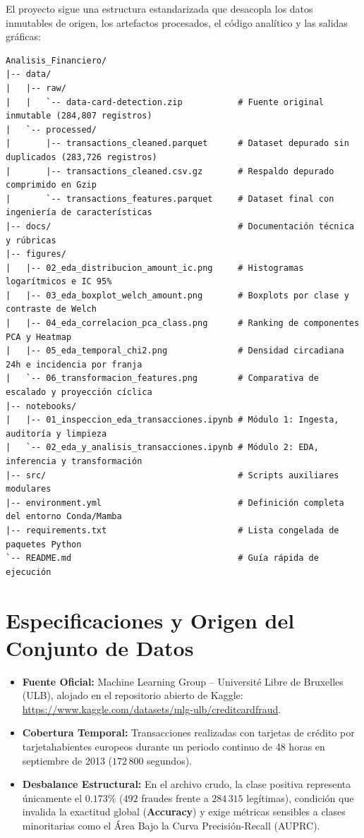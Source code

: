 \documentclass[11pt]{article}
\begin{document}
El proyecto sigue una estructura estandarizada que desacopla los datos inmutables de origen, los artefactos procesados, el código analítico y las salidas gráficas:

\begin{verbatim}
Analisis_Financiero/
|-- data/
|   |-- raw/
|   |   `-- data-card-detection.zip           # Fuente original inmutable (284,807 registros)
|   `-- processed/
|       |-- transactions_cleaned.parquet      # Dataset depurado sin duplicados (283,726 registros)
|       |-- transactions_cleaned.csv.gz       # Respaldo depurado comprimido en Gzip
|       `-- transactions_features.parquet     # Dataset final con ingeniería de características
|-- docs/                                     # Documentación técnica y rúbricas
|-- figures/
|   |-- 02_eda_distribucion_amount_ic.png     # Histogramas logarítmicos e IC 95%
|   |-- 03_eda_boxplot_welch_amount.png       # Boxplots por clase y contraste de Welch
|   |-- 04_eda_correlacion_pca_class.png      # Ranking de componentes PCA y Heatmap
|   |-- 05_eda_temporal_chi2.png              # Densidad circadiana 24h e incidencia por franja
|   `-- 06_transformacion_features.png        # Comparativa de escalado y proyección cíclica
|-- notebooks/
|   |-- 01_inspeccion_eda_transacciones.ipynb # Módulo 1: Ingesta, auditoría y limpieza
|   `-- 02_eda_y_analisis_transacciones.ipynb # Módulo 2: EDA, inferencia y transformación
|-- src/                                      # Scripts auxiliares modulares
|-- environment.yml                           # Definición completa del entorno Conda/Mamba
|-- requirements.txt                          # Lista congelada de paquetes Python
`-- README.md                                 # Guía rápida de ejecución
\end{verbatim}

\section{Especificaciones y Origen del Conjunto de Datos}
\label{sec:org6045957}

\begin{itemize}
\item \textbf{Fuente Oficial:} Machine Learning Group -- Université Libre de Bruxelles (ULB), alojado en el repositorio abierto de Kaggle: \url{https://www.kaggle.com/datasets/mlg-ulb/creditcardfraud}.
\item \textbf{Cobertura Temporal:} Transacciones realizadas con tarjetas de crédito por tarjetahabientes europeos durante un periodo continuo de 48 horas en septiembre de 2013 (\(172\,800\) segundos).
\item \textbf{Desbalance Estructural:} En el archivo crudo, la clase positiva representa únicamente el \(0.173\%\) (\(492\) fraudes frente a \(284\,315\) legítimas), condición que invalida la exactitud global (\textbf{Accuracy}) y exige métricas sensibles a clases minoritarias como el Área Bajo la Curva Precisión-Recall (AUPRC).
\end{itemize}
\end{document}
